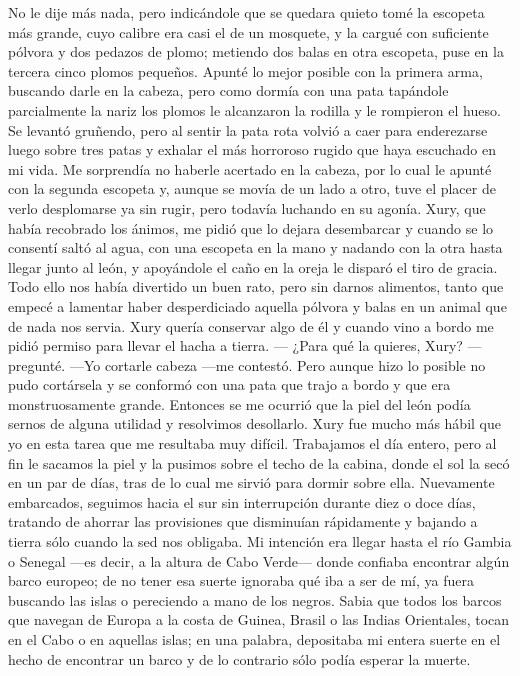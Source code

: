\documentclass{novela}
\begin{document}
    No le dije más nada, pero indicándole que se quedara quieto tomé la escopeta más grande, cuyo calibre era casi el de un mosquete, y la cargué con suficiente pólvora y dos pedazos de plomo; metiendo dos balas en otra escopeta, puse en la tercera cinco plomos pequeños. Apunté lo mejor posible con la primera arma, buscando darle en la cabeza, pero como dormía con una pata tapándole parcialmente la nariz los plomos le alcanzaron la rodilla y le rompieron el hueso. Se levantó gruñendo, pero al sentir la pata rota volvió a caer para enderezarse luego sobre tres patas y exhalar el más horroroso rugido que haya escuchado en mi vida. Me sorprendía no haberle acertado en la cabeza, por lo cual le apunté con la segunda escopeta y, aunque se movía de un lado a otro, tuve el placer de verlo desplomarse ya sin rugir, pero todavía luchando en su agonía. Xury, que había recobrado los ánimos, me pidió que lo dejara desembarcar y cuando se lo consentí saltó al agua, con una escopeta en la mano y nadando con la otra hasta llegar junto al león, y apoyándole el caño en la oreja le disparó el tiro de gracia.
    Todo ello nos había divertido un buen rato, pero sin darnos alimentos, tanto que empecé a lamentar haber desperdiciado aquella pólvora y balas en un animal que de nada nos servia. Xury quería conservar algo de él y cuando vino a bordo me pidió permiso para llevar el hacha a tierra.
    — ¿Para qué la quieres, Xury? —pregunté.
    —Yo cortarle cabeza —me contestó. Pero aunque hizo lo posible no pudo cortársela y se conformó con una pata que trajo a bordo y que era monstruosamente grande. Entonces se me ocurrió que la piel del león podía sernos de alguna utilidad y resolvimos desollarlo. Xury fue mucho más hábil que yo en esta tarea que me resultaba muy difícil. Trabajamos el día entero, pero al fin le sacamos la piel y la pusimos sobre el techo de la cabina, donde el sol la secó en un par de días, tras de lo cual me sirvió para dormir sobre ella.
    Nuevamente embarcados, seguimos hacia el sur sin interrupción durante diez o doce días, tratando de ahorrar las provisiones que disminuían rápidamente y bajando a tierra sólo cuando la sed nos obligaba. Mi intención era llegar hasta el río Gambia o Senegal —es decir, a la altura de Cabo Verde— donde confiaba encontrar algún barco europeo; de no tener esa suerte ignoraba qué iba a ser de mí, ya fuera buscando las islas o pereciendo a mano de los negros. Sabia que todos los barcos que navegan de Europa a la costa de Guinea, Brasil o las Indias Orientales, tocan en el Cabo o en aquellas islas; en una palabra, depositaba mi entera suerte en el hecho de encontrar un barco y de lo contrario sólo podía esperar la muerte.
\end{document}
